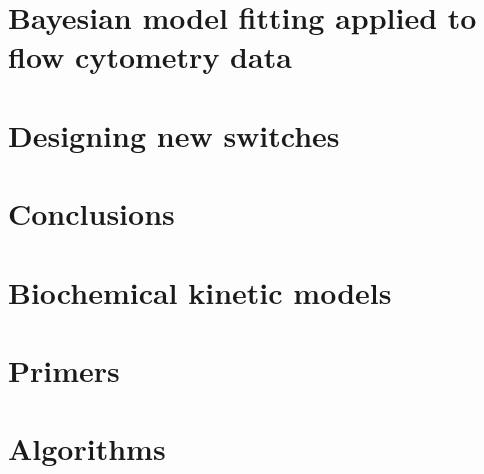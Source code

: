 \documentclass[]{phdthesis}
\begin{document}
\mainmatter*
\chapter{Bayesian model fitting applied to flow cytometry data}
\label{ch:Flow}

%
%

\mainmatter*
\chapter{Designing new switches}
\label{ch:desSw}


\mainmatter*
\chapter{Conclusions}


\printbibliography

\appendix*
{}
\chapter{Biochemical kinetic models}
\label{ap:ODEs}

\chapter{Primers}
\label{ap:Prim}

\chapter{Algorithms}
\label{ap:Alg}

\end{document}

